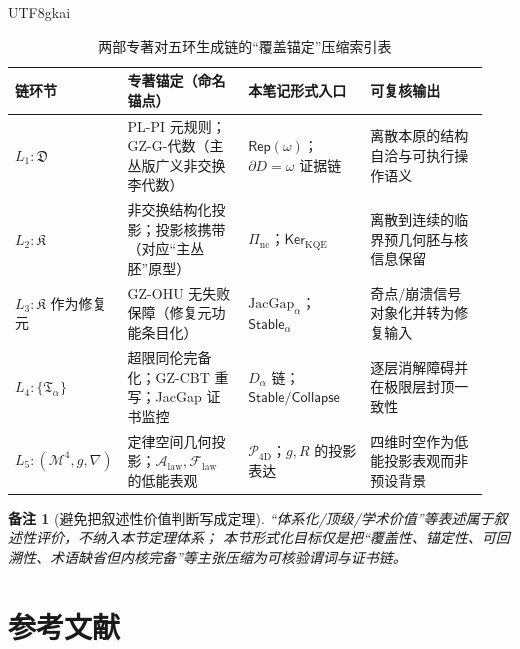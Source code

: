 \documentclass[12pt]{article}
\newtheorem{remark}{备注}[section]
\begin{document}
\begin{CJK*}{UTF8}{gkai}
\begin{table}[htbp]
\centering
{\footnotesize
\setlength{\tabcolsep}{2pt}
\renewcommand{\arraystretch}{1.25}
\begin{tabular}{|p{0.16\linewidth}|p{0.26\linewidth}|p{0.26\linewidth}|p{0.26\linewidth}|}
\hline
\textbf{链环节} & \textbf{专著锚定（命名锚点）} & \textbf{本笔记形式入口} & \textbf{可复核输出} \\
\hline
$L_1:\mathfrak{D}$ &
PL-PI 元规则；GZ-G-代数（主丛版广义非交换李代数） &
$\mathsf{Rep}(\omega)$；$\partial D=\omega$ 证据链 &
离散本原的结构自洽与可执行操作语义 \\
\hline
$L_2:\mathfrak{K}$ &
非交换结构化投影；投影核携带（对应“主丛胚”原型） &
$\Pi_{\mathrm{nc}}$；$\mathsf{Ker}_{\mathrm{KQE}}$ &
离散到连续的临界预几何胚与核信息保留 \\
\hline
$L_3:\mathfrak{K}$ 作为修复元 &
GZ-OHU 无失败保障（修复元功能条目化） &
$\mathrm{JacGap}_{\alpha}$；$\mathsf{Stable}_{\alpha}$ &
奇点/崩溃信号对象化并转为修复输入 \\
\hline
$L_4:\{\mathfrak{T}_{\alpha}\}$ &
超限同伦完备化；GZ-CBT 重写；JacGap 证书监控 &
$D_{\alpha}$ 链；$\mathsf{Stable}/\mathsf{Collapse}$ &
逐层消解障碍并在极限层封顶一致性 \\
\hline
$L_5:(\mathcal{M}^4,g,\nabla)$ &
定律空间几何投影；$\mathcal{A}_{\mathrm{law}},\mathcal{F}_{\mathrm{law}}$ 的低能表观 &
$\mathcal{P}_{\mathrm{4D}}$；$g,R$ 的投影表达 &
四维时空作为低能投影表观而非预设背景 \\
\hline
\end{tabular}
}
\caption{\texorpdfstring{两部专著对五环生成链的“覆盖锚定”压缩索引表}{两部专著对五环生成链的覆盖锚定压缩索引表}}
\label{tab:tex29-books-cover-chain-map}
\end{table}

\begin{remark}[避免把叙述性价值判断写成定理]
“体系化/顶级/学术价值”等表述属于叙述性评价，不纳入本节定理体系；
本节形式化目标仅是把“覆盖性、锚定性、可回溯性、术语缺省但内核完备”等主张压缩为可核验谓词与证书链。
\end{remark}

\clearpage

\section{参考文献}
\label{sec:tex29-bibliography}
\label{sec:tex29-ch20}


\end{CJK*}
\end{document}

